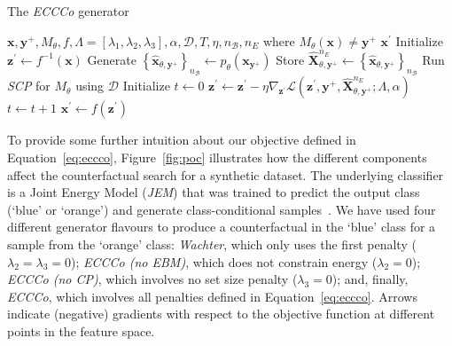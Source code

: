 \documentclass{article}
\begin{document}
\begin{algorithm}
  \caption{The \textit{ECCCo} generator}\label{alg:eccco}
  \begin{algorithmic}[1]
    \Require $\mathbf{x}, \mathbf{y}^+, M_{\theta}, f, \Lambda=[\lambda_1,\lambda_2,\lambda_3], \alpha, \mathcal{D}, T, \eta, n_{\mathcal{B}}, n_E$ where $M_{\theta}(\mathbf{x})\neq\mathbf{y}^+$
    \Ensure $\mathbf{x}^\prime$
    \State Initialize $\mathbf{z}^\prime \gets f^{-1}(\mathbf{x})$ 
    \State Generate $\left\{\hat{\mathbf{x}}_{\theta,\mathbf{y}^+}\right\}_{n_{\mathcal{B}}} \gets p_{\theta}(\mathbf{x}_{\mathbf{y}^+})$ 
    \State Store $\hat{\mathbf{X}}^{n_E}_{\theta,\mathbf{y}^+} \gets \left\{\hat{\mathbf{x}}_{\theta,\mathbf{y}^+}\right\}_{n_{\mathcal{B}}}$ 
    \State Run \textit{SCP} for $M_{\theta}$ using $\mathcal{D}$ 
    \State Initialize $t \gets 0$
     
    \State $\mathbf{z}^\prime \gets \mathbf{z}^\prime - \eta \nabla_{\mathbf{z}^\prime} \mathcal{L}(\mathbf{z}^\prime,\mathbf{y}^+,\hat{\mathbf{X}}^{n_E}_{\theta,\mathbf{y}^+}; \Lambda, \alpha)$ 
    \State $t \gets t+1$
    \EndWhile
    \State $\mathbf{x}^\prime \gets f(\mathbf{z}^\prime)$ 
  \end{algorithmic}
\end{algorithm}

To provide some further intuition about our objective defined in Equation~\ref{eq:eccco}, Figure~\ref{fig:poc} illustrates how the different components affect the counterfactual search for a synthetic dataset. The underlying classifier is a Joint Energy Model (\textit{JEM}) that was trained to predict the output class (`blue' or `orange') and generate class-conditional samples~\citep{grathwohl2020your}. We have used four different generator flavours to produce a counterfactual in the `blue' class for a sample from the `orange' class: \textit{Wachter}, which only uses the first penalty ($\lambda_2=\lambda_3=0$); \textit{ECCCo (no EBM)}, which does not constrain energy ($\lambda_2=0$); \textit{ECCCo (no CP)}, which involves no set size penalty ($\lambda_3=0$); and, finally, \textit{ECCCo}, which involves all penalties defined in Equation~\ref{eq:eccco}. Arrows indicate (negative) gradients with respect to the objective function at different points in the feature space. 
\end{document}
